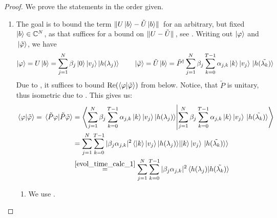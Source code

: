 \begin{proof} We prove the statements in the order given.
    \begin{enumerate}[label=(\roman*), wide]
        \item \label{evol_time_theorem_1} The goal is to bound the term \(\norm*{U\ket{b}-\displaystyle\tilde{U}\ket{b}}\) for an arbitrary, but fixed \(\ket{b} \in \mathbb{C}^N\), as that suffices for a bound on \(\norm*{U-\tilde{U}}\), see . Writing out \(\ket{\varphi}\) and \(\ket*{\tilde{\varphi}}\), we have
        \begin{align}
            \ket{\varphi} = U\ket{b} = \sum_{j=1}^N \beta_j \ket{0}\ket{v_j}\ket{h(\lambda_j)} \qquad \ket*{\tilde{\varphi}} = \tilde{U}\ket{b} = \tilde{P}^\dagger \sum_{j=1}^N \beta_j \sum_{k=0}^{T-1} \alpha_{j, k} \ket{k}\ket{v_j}\ket*{h(\tilde{\lambda_k})}
        \end{align}
        Due to , it suffices to bound \(\Re(\braket{\varphi}{\tilde{\varphi}})\) from below. Notice, that \(\tilde{P}\) is unitary, thus isometric due to . This gives us:
        \begin{align}
            \braket*{\varphi}{\tilde{\varphi}} = \braket*{\tilde{P}\varphi}{\tilde{P}\tilde{\varphi}} &= \braket{\sum_{j=1}^N \beta_j\sum_{k=0}^{T-1} \alpha_{j, k} \ket{k}\ket{v_j}\ket{h(\lambda_j)}}{\sum_{j=1}^N \beta_j\sum_{k=0}^{T-1} \alpha_{j, k} \ket{k}\ket{v_j}\ket*{h(\tilde{\lambda_k})}}\\
            &= \sum_{j=1}^N \sum_{k=0}^{T-1} |\beta_j\alpha_{j, k}|^2 \braket*{\ket{k}\ket{v_j}\ket{h(\lambda_j)}}{\ket{k}\ket{v_j}\ket*{h(\tilde{\lambda_k})}}\\
            &\overset{\ref{evol_time_calc_1}}{=} \sum_{j=1}^N \sum_{k=0}^{T-1} |\beta_j\alpha_{j, k}|^2 \braket*{h(\lambda_j)}{h(\tilde{\lambda_k})}
        \end{align}
        \begin{enumerate}[label=(\arabic*)]
            \item \label{evol_time_calc_1} We use . 
        \end{enumerate}
        

\end{enumerate}
\end{proof}
